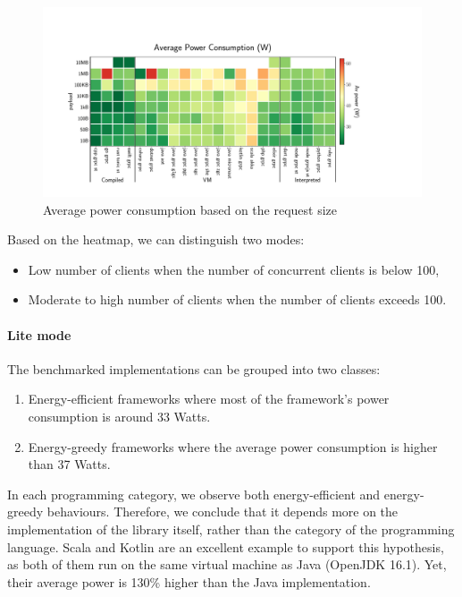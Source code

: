 \begin{figure}[!hbt]
    \begin{center}
        \includegraphics[width=1.2\linewidth]{imgs/power_consumption_payload}
    \end{center}
    \caption{Average power consumption based on the request size}\label{fig:power_consumption_payload}
\end{figure}

Based on the heatmap, we can distinguish two modes:
\begin{itemize}
    \item \textsf{Low number of clients} when the number of concurrent clients is below 100,
    \item \textsf{Moderate to high number of clients} when the number of clients exceeds 100.
\end{itemize}


\paragraph{Lite mode}
The benchmarked implementations can be grouped into two classes:
\begin{enumerate}
    \item \textsf{Energy-efficient frameworks} where most of the framework's power consumption is around 33 Watts.
    \item \textsf{Energy-greedy frameworks} where the average power consumption is higher than 37 Watts.
\end{enumerate}

In each programming category, we observe both energy-efficient and energy-greedy behaviours.
Therefore, we conclude that it depends more on the implementation of the library itself, rather than the category of the programming language.
Scala and Kotlin are an excellent example to support this hypothesis, as both of them run on the same virtual machine as Java (OpenJDK 16.1).
Yet, their average power is 130\% higher than the Java implementation.

